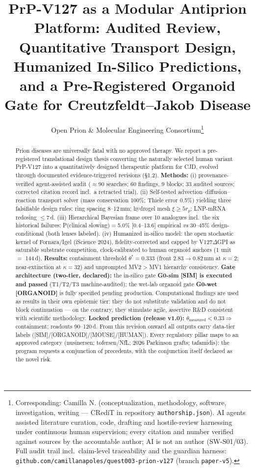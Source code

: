 \documentclass[10pt,twocolumn]{article}
\title{\bfseries PrP-V127 as a Modular Antiprion Platform: Audited Review, Quantitative Transport Design, Humanized In-Silico Predictions, and a Pre-Registered Organoid Gate for Creutzfeldt--Jakob Disease}
\author{\normalsize Open Prion \& Molecular Engineering Consortium\thanks{Corresponding: Camilla N. (conceptualization, methodology, software, investigation, writing --- CRediT in repository \texttt{authorship.json}). AI agents assisted literature curation, code, drafting and hostile-review harnessing under continuous human supervision; every citation and number verified against sources by the accountable author; AI is not an author (SW-S01/03). Full audit trail incl.\ claim-level traceability and the guardian harness: \texttt{github.com/camillanapoles/quest003-prion-v127} (branch \texttt{paper-v5}).}}
\date{}
\begin{document}
\maketitle

\begin{abstract}\small
Prion diseases are universally fatal with no approved therapy. We report a pre-registered translational design thesis converting the naturally selected human variant PrP-V127 into a quantitatively designed therapeutic platform for CJD, evolved through documented evidence-triggered revisions (\S1.2). \textbf{Methods:} (i) provenance-verified agent-assisted audit ($\approx$90 searches; 60 findings, 9 blocks; 33 audited sources; corrected citation record incl.\ a retracted trial). (ii) Self-tested advection--diffusion--reaction transport solver (mass conservation 100\%; Thiele error 0.5\%) yielding three falsifiable design rules: ring spacing 8--12\,mm; hydrogel mesh $\xi\ge5r_p$; LNP-mRNA redosing $\le$7\,d. (iii) Hierarchical Bayesian frame over 10 analogues incl.\ the six historical failures: P(clinical slowing)$=$5.0\% [0.4--13.6] empirical \emph{vs} 30--45\% design-conditional (both lenses labeled). (iv) Humanized in-silico model: the open stochastic kernel of Fornara/Igel (iScience 2024), fidelity-corrected and capped by V127$\Delta$GPI as saturable substrate competition, clock-calibrated to human organoid anchors (1 unit $=$ 144\,d). \textbf{Results:} containment threshold $\theta^{*}=0.333$ (front 2.83$\to$0.82\,mm at $\kappa{=}2$; near-extinction at $\kappa{=}32$) and unprompted MV2$>$MV1 hierarchy consistency. \textbf{Gate architecture (two-tier, declared):} the in-silico gate \textbf{G0-sim [SIM] is executed and passed} (T1/T2/T3 machine-audited); the wet-lab organoid gate \textbf{G0-wet [ORGANOID]} is fully specified pending production. Computational findings are used as results in their own epistemic tier: they do not substitute validation and do not block continuation --- on the contrary, they stimulate agile, assertive R\&D consistent with scientific methodology. \textbf{Locked prediction (release v1.0):} $\theta_{\text{measured}}<0.33\Rightarrow$ containment; readouts 90--120\,d. From this revision onward all outputs carry data-tier labels ([SIM]/[ORGANOID]/[MOUSE]/[HUMAN]). Every regulatory pillar maps to an approved category (nusinersen; tofersen/NfL; 2026 Parkinson grafts; tafamidis): the program requests a conjunction of precedents, with the conjunction itself declared as the novel risk.
\end{abstract}
\end{document}
